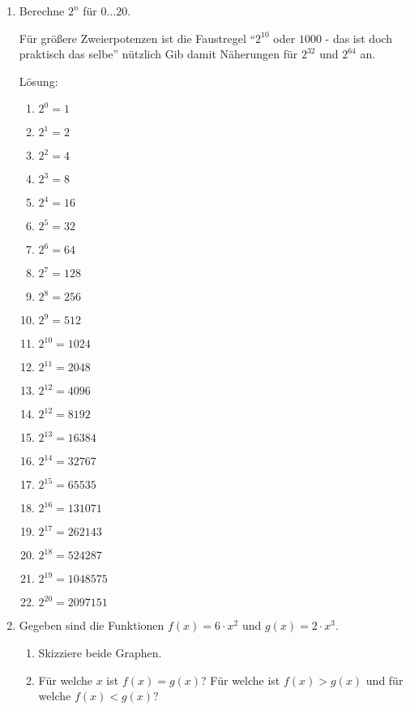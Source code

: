 \documentclass[main.tex]{subfiles}
\begin{document}
\begin{enumerate}
	\item Berechne \( 2^n \) für \( 0 \dots 20 \).

	      Für größere Zweierpotenzen ist die Faustregel "`\( 2^{10} \) oder \( 1000 \) - das ist doch praktisch das selbe"'
	      nützlich Gib damit Näherungen für \( 2^{32} \) und \( 2^{64} \) an.

	      Lösung:
	      \begin{multicols}{3}
		      \begin{enumerate}
			      \item \( 2^0 = 1 \)
			      \item \( 2^1 = 2 \)
			      \item \( 2^2 = 4 \)
			      \item \( 2^3 = 8 \)
			      \item \( 2^4 = 16 \)
			      \item \( 2^5 = 32 \)
			      \item \( 2^6 = 64 \)
			      \item \( 2^7 = 128 \)
			      \item \( 2^8 =  256 \)
			      \item \( 2^9 = 512 \)
			      \item \( 2^{10} = 1024 \)
			      \item \( 2^{11} = 2048 \)
			      \item \( 2^{12} = 4096 \)
			      \item \( 2^{12} = 8192 \)
			      \item \( 2^{13} = 16384 \)
			      \item \( 2^{14} = 32767 \)
			      \item \( 2^{15} = 65535 \)
			      \item \( 2^{16} = 131071 \)
			      \item \( 2^{17} = 262143 \)
			      \item \( 2^{18} = 524287 \)
			      \item \( 2^{19} = 1 048 575 \)
			      \item \( 2^{20} = 2 097 151 \)
		      \end{enumerate}
	      \end{multicols}
	\item Gegeben sind die Funktionen \( f(x) = 6 \cdot x^2 \) und \( g(x) = 2 \cdot x^3 \).
	      \begin{enumerate}
		      \item Skizziere beide Graphen.
		      \item Für welche \( x \) ist \( f(x) = g(x) \)?
		            Für welche ist \( f(x) > g(x) \) und für welche \( f(x) < g(x) \)?
	      \end{enumerate}


\end{enumerate}
\end{document}
